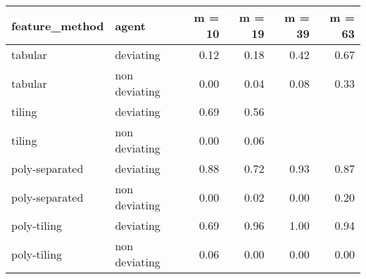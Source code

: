 \begin{tabular}{llrrrr}
  \hline
feature\_method & agent & m = 10 & m = 19 & m = 39 & m = 63 \\ 
  \hline
tabular & deviating & 0.12 & 0.18 & 0.42 & 0.67 \\ 
  tabular & non deviating & 0.00 & 0.04 & 0.08 & 0.33 \\ 
  tiling & deviating & 0.69 & 0.56 &  &  \\ 
  tiling & non deviating & 0.00 & 0.06 &  &  \\ 
  poly-separated & deviating & 0.88 & 0.72 & 0.93 & 0.87 \\ 
  poly-separated & non deviating & 0.00 & 0.02 & 0.00 & 0.20 \\ 
  poly-tiling & deviating & 0.69 & 0.96 & 1.00 & 0.94 \\ 
  poly-tiling & non deviating & 0.06 & 0.00 & 0.00 & 0.00 \\ 
   \hline
\end{tabular}
